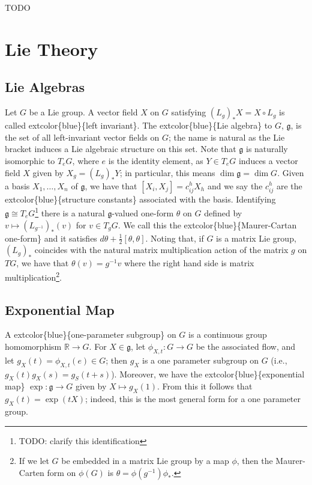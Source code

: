 \documentclass[
]{book}
\begin{document}
TODO

\hypertarget{lie-theory}{%
\chapter{Lie Theory}\label{lie-theory}}

\hypertarget{lie-algebras}{%
\section{Lie Algebras}\label{lie-algebras}}

Let \(G\) be a Lie group.
A vector field \(X\) on \(G\) satisfying \((L_g)_* X = X \circ L_g\) is called extcolor\{blue\}\{left invariant\}.
The extcolor\{blue\}\{Lie algebra\} to \(G\), \(\mathfrak{g}\), is the set of all left-invariant vector fields on \(G\); the name is natural as the Lie bracket induces a Lie algebraic structure on this set.
Note that \(\mathfrak{g}\) is naturally isomorphic to \(T_e G\), where \(e\) is the identity element, as \(Y \in T_e G\) induces a vector field \(X\) given by \(X_g = (L_g)_* Y\); in particular, this means \(\dim \mathfrak{g} = \dim G\).
Given a basis \(X_1, \dots, X_n\) of \(\mathfrak{g}\), we have that \([X_i, X_j] = c_{ij}^h X_h\) and we say the \(c_{ij}^h\) are the extcolor\{blue\}\{structure constants\} associated with the basis.
Identifying \(\mathfrak{g} \cong T_e G\)\footnote{TODO: clarify this identification} there is a natural \(\mathfrak{g}\)-valued one-form \(\theta\) on \(G\) defined by \(v \mapsto (L_{g^{-1}})_*(v)\) for \(v \in T_g G\).
We call this the extcolor\{blue\}\{Maurer-Cartan one-form\} and it satisfies \(d\theta + \frac{1}{2}[\theta, \theta]\).
Noting that, if \(G\) is a matrix Lie group, \((L_g)_*\) coincides with the natural matrix multiplication action of the matrix \(g\) on \(TG\), we have that \(\theta(v) = g^{-1}v\) where the right hand side is matrix multiplication\footnote{If we let \(G\) be embedded in a matrix Lie group by a map \(\phi\), then the Maurer-Carten form on \(\phi(G)\) is \(\theta = \phi(g^{-1})\phi_*\).}.

\hypertarget{exponential-map}{%
\section{Exponential Map}\label{exponential-map}}

A extcolor\{blue\}\{one-parameter subgroup\} on \(G\) is a continuous group homomorphism \(\mathbb{R} \to G\). For \(X \in \mathfrak{g}\), let \(\phi_{X,t} : G \to G\) be the associated flow, and let \(g_X(t) = \phi_{X,t}(e) \in G\); then \(g_X\) is a one parameter subgroup on \(G\) (i.e., \(g_X(t)g_X(s) = g_S(t+s)\)).
Moreover, we have the extcolor\{blue\}\{exponential map\} \(\exp : \mathfrak{g} \to G\) given by \(X \mapsto g_X(1)\).
From this it follows that \(g_X(t) = \exp(tX)\); indeed, this is the most general form for a one parameter group.
\end{document}

